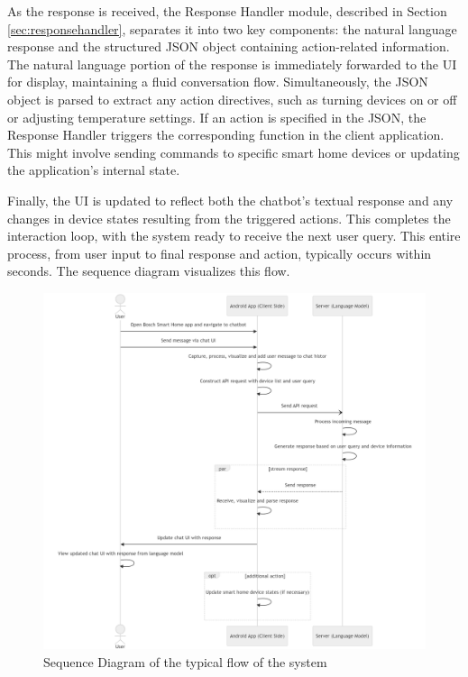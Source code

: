 As the response is received, the Response Handler module, described in Section \ref{sec:responsehandler}, separates it into two key components: the natural language response and the structured JSON object containing action-related information.
The natural language portion of the response is immediately forwarded to the UI for display, maintaining a fluid conversation flow. Simultaneously, the JSON object is parsed to extract any action directives, such as turning devices on or off or adjusting temperature settings.
If an action is specified in the JSON, the Response Handler triggers the corresponding function in the client application. This might involve sending commands to specific smart home devices or updating the application's internal state.

Finally, the UI is updated to reflect both the chatbot's textual response and any changes in device states resulting from the triggered actions. This completes the interaction loop, with the system ready to receive the next user query.
This entire process, from user input to final response and action, typically occurs within seconds. The sequence diagram visualizes this flow.

\begin{figure}[h]
    \centering
    \captionsetup{justification=centering}
    \includegraphics[width=\textwidth]{graphics/sequencedia.png}
    \caption{Sequence Diagram of the typical flow of the system}
    \label{fig:sequencedia}
\end{figure}

